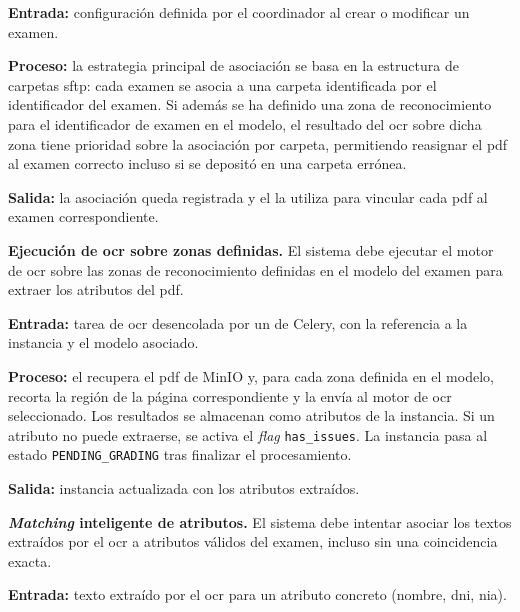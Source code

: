 \begin{functional}
    \textbf{Entrada:} configuración definida por el coordinador al crear o modificar un
    examen.

    \textbf{Proceso:} la estrategia principal de asociación se basa en la estructura de
    carpetas \acs{sftp}: cada examen se asocia a una carpeta identificada por el
    identificador del examen. Si además se ha definido una zona de reconocimiento para el
    identificador de examen en el modelo, el resultado del \acs{ocr} sobre dicha zona tiene
    prioridad sobre la asociación por carpeta, permitiendo reasignar el \acs{pdf} al examen
    correcto incluso si se depositó en una carpeta errónea.

    \textbf{Salida:} la asociación queda registrada y el  la utiliza para
    vincular cada \acs{pdf} al examen correspondiente.

    \item \textbf{Ejecución de \acs{ocr} sobre zonas definidas.}
    \label{rf:ingestion:ocr_zones}
    El sistema debe ejecutar el motor de \acs{ocr} sobre las zonas de reconocimiento
    definidas en el modelo del examen para extraer los atributos del \acs{pdf}.

    \textbf{Entrada:} tarea de \acs{ocr} desencolada por un  de Celery, con la
    referencia a la instancia y el modelo asociado.

    \textbf{Proceso:} el  recupera el \acs{pdf} de MinIO y, para cada zona
    definida en el modelo, recorta la región de la página correspondiente y la envía al
    motor de \acs{ocr} seleccionado. Los resultados se almacenan como atributos de la
    instancia. Si un atributo no puede extraerse, se activa el \textit{flag}
    \texttt{has\_issues}. La instancia pasa al estado \texttt{PENDING\_GRADING} tras
    finalizar el procesamiento.

    \textbf{Salida:} instancia actualizada con los atributos extraídos.

    \item \textbf{\textit{Matching} inteligente de atributos.}
    \label{rf:ingestion:matching}
    El sistema debe intentar asociar los textos extraídos por el \acs{ocr} a atributos
    válidos del examen, incluso sin una coincidencia exacta.

    \textbf{Entrada:} texto extraído por el \acs{ocr} para un atributo concreto (nombre,
    \acs{dni}, \acs{nia}).


\end{functional}
